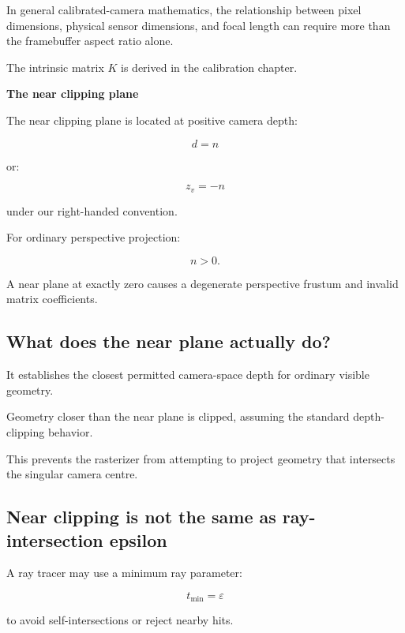 In general calibrated-camera mathematics, the relationship between pixel dimensions, physical sensor dimensions, and focal length can require more than the framebuffer aspect ratio alone.

The intrinsic matrix \(K\) is derived in the calibration chapter.

\textbf{The near clipping plane}

The near clipping plane is located at positive camera depth:

\[
 \boxed{d=n}
\]

or:

\[
 z_v=-n
\]

under our right-handed convention.

For ordinary perspective projection:

\[
 \boxed{n>0}.
\]

A near plane at exactly zero causes a degenerate perspective frustum and invalid matrix coefficients.

\subsection{What does the near plane actually do?}\label{02-foundations-ii-ch033-what-does-the-near-plane-actually-do}

\hypertarget{02-foundations-ii-ch033-what-does-the-near-plane-actually-do}{}

It establishes the closest permitted camera-space depth for ordinary visible geometry.

Geometry closer than the near plane is clipped, assuming the standard depth-clipping behavior.

This prevents the rasterizer from attempting to project geometry that intersects the singular camera centre.

\subsection{Near clipping is not the same as ray-intersection epsilon}\label{02-foundations-ii-ch033-near-clipping-is-not-the-same-as-ray-intersection-epsilon}

\hypertarget{02-foundations-ii-ch033-near-clipping-is-not-the-same-as-ray-intersection-epsilon}{}

A ray tracer may use a minimum ray parameter:

\[
 t_{\min}=\varepsilon
\]

to avoid self-intersections or reject nearby hits.

